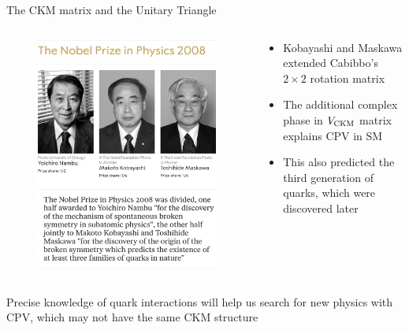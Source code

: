 \documentclass[dvipsnames]{beamer}
\begin{document}
\begin{frame}{The CKM matrix and the Unitary Triangle}
  \begin{columns}
    \begin{column}{0.4\textwidth}
      \begin{figure}
        \includegraphics[width=1.0\textwidth]{Plots/NobelPrizePhysics2008.png}
      \end{figure}
    \end{column}
    \begin{column}{0.6\textwidth}
      \begin{itemize}
        \setlength\itemsep{1.0em}
        \item{Kobayashi and Maskawa extended Cabibbo's $2\times2$ rotation matrix}
        \item{The additional complex phase in $V_{\rm CKM}$ matrix explains CPV in SM}
        \item{This also predicted the third generation of quarks, which were discovered later}
      \end{itemize}
    \end{column}
  \end{columns}
  \begin{center}
    \large Precise knowledge of quark interactions will help us search for new physics with CPV, which may not have the same CKM structure
  \end{center}
\end{frame}
\end{document}
